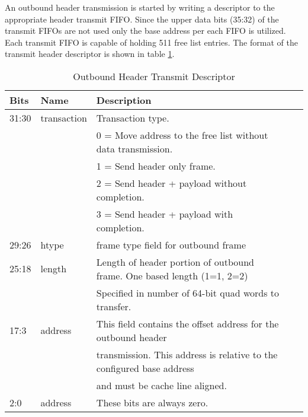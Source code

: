 \documentclass[11pt]{article}
\begin{document}
An outbound header transmission is started by writing a descriptor to the appropriate header transmit FIFO. 
Since the upper data bits (35:32) of the transmit FIFOs are not used only the base address per each FIFO is utilized. 
Each transmit FIFO is capable of holding 511 free list entries. 
The format of the transmit header descriptor is shown in table \ref{tab:ob_tx_desc}.

\begin{table}[H]
\small
\centering
   \begin{tabular}{| l | l | l | l | l | } 
      \hline \textbf{Bits} & \textbf{Name} & \textbf{Description} \\
      \hline 31:30         & transaction   & Transaction type.  \\
                           &               & 0 = Move address to the free list without data transmission. \\
                           &               & 1 = Send header only frame. \\
                           &               & 2 = Send header + payload without completion. \\
                           &               & 3 = Send header + payload with completion. \\
      \hline 29:26         & htype         & frame type field for outbound frame                                  \\
      \hline 25:18         & length        & Length of header portion of outbound frame. One based length (1=1, 2=2) \\
                           &               & Specified in number of 64-bit quad words to transfer.                \\
      \hline 17:3          & address       & This field contains the offset address for the outbound header       \\
                           &               & transmission. This address is relative to the configured base address  \\
                           &               & and must be cache line aligned.                                        \\
      \hline 2:0           & address       & These bits are always zero.                                            \\
      \hline
   \end{tabular}
   \caption{Outbound Header Transmit Descriptor}
   \label{tab:ob_tx_desc}
\end{table}
\end{document}
